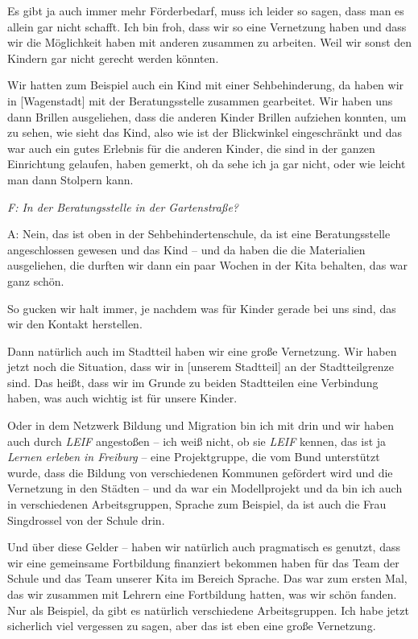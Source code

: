 \begin{linenumbers*}
Es gibt ja auch immer mehr Förderbedarf, muss ich leider so sagen, dass man es allein gar nicht schafft. Ich bin froh, dass wir so eine Vernetzung haben und dass wir die Möglichkeit haben mit anderen zusammen zu arbeiten. Weil wir sonst den Kindern gar nicht gerecht werden könnten. 

Wir hatten zum Beispiel auch ein Kind mit einer Sehbehinderung, da haben wir in [Wagenstadt] mit der Beratungsstelle zusammen gearbeitet. Wir haben uns dann Brillen ausgeliehen, dass die anderen Kinder Brillen aufziehen konnten, um zu sehen, wie sieht das Kind, also wie ist der Blickwinkel eingeschränkt und das war auch ein gutes Erlebnis für die anderen Kinder, die sind in der ganzen Einrichtung gelaufen, haben gemerkt, oh da sehe ich ja gar nicht, oder wie leicht man dann Stolpern kann. 

\emph{F: In der Beratungsstelle in der Gartenstraße?}

A: Nein, das ist oben in der Sehbehindertenschule, da ist eine Beratungsstelle angeschlossen gewesen und das Kind -- und da haben die die Materialien ausgeliehen, die durften wir dann ein paar Wochen in der Kita behalten, das war ganz schön. 

So gucken wir halt immer, je nachdem was für Kinder gerade bei uns sind, das wir den Kontakt herstellen. 

Dann natürlich auch im Stadtteil haben wir eine große Vernetzung. Wir haben jetzt noch die Situation, dass wir in [unserem Stadtteil] an der Stadtteilgrenze sind. Das heißt, dass wir im Grunde zu beiden Stadtteilen eine Verbindung haben, was auch wichtig ist für unsere Kinder.

Oder in dem Netzwerk Bildung und Migration bin ich mit drin und wir haben auch durch \emph{LEIF} angestoßen -- ich weiß nicht, ob sie \emph{LEIF} kennen, das ist ja \emph{Lernen erleben in Freiburg} -- eine Projektgruppe, die vom Bund unterstützt wurde, dass die Bildung von verschiedenen Kommunen gefördert wird und die Vernetzung in den Städten  -- und da war ein Modellprojekt und da bin ich auch in verschiedenen Arbeitsgruppen, Sprache zum Beispiel, da ist auch die Frau Singdrossel von der Schule drin. 

Und über diese Gelder -- haben wir natürlich auch pragmatisch es genutzt, dass wir eine gemeinsame Fortbildung finanziert bekommen haben für das Team der Schule und das Team unserer Kita im Bereich Sprache. Das war zum ersten Mal, das wir zusammen mit Lehrern eine Fortbildung hatten, was wir schön fanden. Nur als Beispiel, da gibt es natürlich verschiedene Arbeitsgruppen. Ich habe jetzt sicherlich viel vergessen zu sagen, aber das ist eben eine große Vernetzung. 


\end{linenumbers*}
